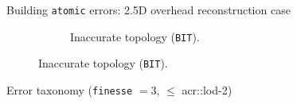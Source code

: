 \documentclass[10pt, export]{beamer}
\begin{document}
\begin{frame}{Building \texttt{atomic} errors: 2.5D overhead reconstruction case}
{\begin{figure}
\begin{center}
\begin{subfigure}{.45\textwidth}
                                \caption{\label{fig::bul_height} Inaccurate topology (\texttt{BIT}).}
                            \end{subfigure}
                        \end{center}
                    \end{figure}
                }
            \end{frame}
            \begin{frame}{Error taxonomy (\texttt{finesse} $= 3$, $\leq$ \acrshort{acr::lod}-2)}
                \begin{figure}
                    
                \end{figure}
            \end{frame}
\end{document}
